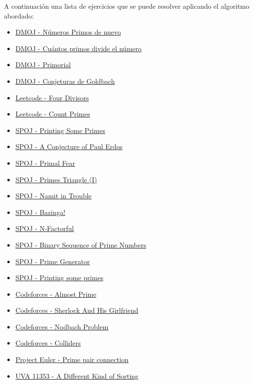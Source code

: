 A continuación una lista de ejercicios que se puede resolver aplicando el algoritmo abordado:

\begin{itemize}
	\item \href{https://dmoj.uclv.edu.cu/problem/primnumagain}{DMOJ - Números Primos de nuevo}
	\item \href{https://dmoj.uclv.edu.cu/problem/primdivisors}{DMOJ - Cuántos primos divide el número}
	\item \href{https://dmoj.uclv.edu.cu/problem/primorial}{DMOJ - Primorial}
	\item \href{https://dmoj.uclv.edu.cu/problem/goldbach}{DMOJ - Conjeturas de Goldbach}
	\item \href{https://leetcode.com/problems/four-divisors/}{Leetcode - Four Divisors}
	\item \href{https://leetcode.com/problems/count-primes/}{Leetcode - Count Primes}
	\item \href{http://www.spoj.com/problems/TDPRIMES/}{SPOJ - Printing Some Primes}
	\item \href{http://www.spoj.com/problems/HS08PAUL/}{SPOJ - A Conjecture of Paul Erdos}
	\item \href{http://www.spoj.com/problems/VECTAR8/}{SPOJ - Primal Fear}
	\item \href{http://www.spoj.com/problems/PTRI/}{SPOJ - Primes Triangle (I)}
	\item \href{http://www.spoj.com/problems/NGIRL/}{SPOJ - Namit in Trouble}
	\item \href{http://www.spoj.com/problems/DCEPC505/}{SPOJ - Bazinga!}
	\item \href{http://www.spoj.com/problems/NFACTOR/}{SPOJ - N-Factorful}
	\item \href{http://www.spoj.com/problems/BSPRIME/}{SPOJ - Binary Sequence of Prime Numbers}
	\item \href{http://www.spoj.com/problems/PRIME1/}{SPOJ - Prime Generator}
	\item \href{http://www.spoj.com/problems/PRIMES2/}{SPOJ - Printing some primes}
	\item \href{http://codeforces.com/contest/26/problem/A}{Codeforces - Almost Prime}
	\item \href{http://codeforces.com/contest/776/problem/B}{Codeforces - Sherlock And His Girlfriend}
	\item \href{https://codeforces.com/problemset/problem/17/A}{Codeforces - Nodbach Problem}
	\item \href{https://codeforces.com/problemset/problem/154/B}{Codeforces - Colliders}
	\item \href{https://www.hackerrank.com/contests/projecteuler/challenges/euler134}{Project Euler - Prime pair connection}
	\item \href{https://uva.onlinejudge.org/index.php?option=com_onlinejudge&Itemid=8&page=show_problem&problem=2338}{UVA 11353 - A Different Kind of Sorting}
\end{itemize}